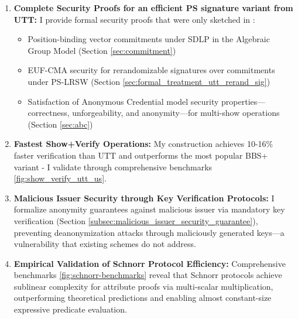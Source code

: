 \begin{enumerate}
    \item \textbf{Complete Security Proofs for an efficient PS signature variant from UTT:} I provide formal security proofs that were only sketched in \cite{tomescu_utt_2022}:
    \begin{itemize}
        \item Position-binding vector commitments under SDLP in the Algebraic Group Model (Section \ref{sec:commitment})
        \item EUF-CMA security for rerandomizable signatures over commitments under PS-LRSW (Section \ref{sec:formal_treatment_utt_rerand_sig})
        \item Satisfaction of Anonymous Credential model \cite{fuchsbauer_structure-preserving_2019} security properties—correctness, unforgeability, and anonymity—for multi-show operations (Section \ref{sec:abc})
    \end{itemize}

    \item \textbf{Fastest Show+Verify Operations:} My construction achieves 10-16\% faster verification than UTT \cite{tomescu_utt_2022} and outperforms the most popular BBS+ variant \cite{camenisch_anonymous_2016} - I validate through comprehensive benchmarks \ref{fig:show_verify_utt_us}.

    \item \textbf{Malicious Issuer Security through Key Verification Protocols:} I formalize anonymity guarantees against malicious issuer via mandatory key verification (Section \ref{subsec:malicious_issuer_security_guarantee}), preventing deanonymization attacks through maliciously generated keys—a vulnerability that existing schemes do not address.

    \item \textbf{Empirical Validation of Schnorr Protocol Efficiency:} Comprehensive benchmarks \ref{fig:schnorr-benchmarks} reveal that Schnorr protocols achieve sublinear complexity for attribute proofs via multi-scalar multiplication, outperforming theoretical predictions and enabling almost constant-size expressive predicate evaluation.
\end{enumerate}

